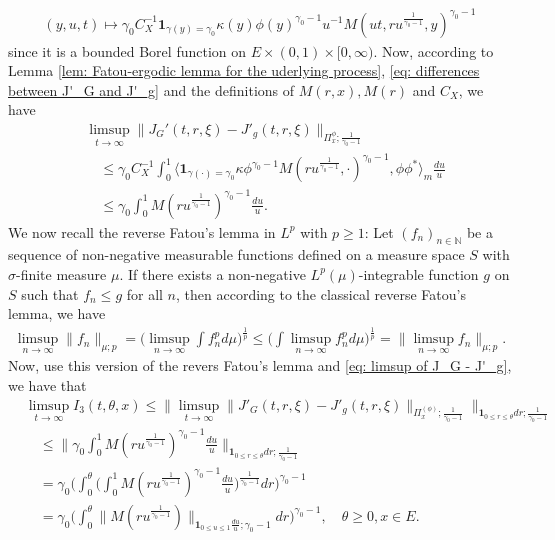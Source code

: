 \begin{align}
	(y,u,t)
	\mapsto \gamma_0 C_X^{-1}\mathbf 1_{\gamma(y) = \gamma_0} \kappa(y)  \phi(y)^{\gamma_0 - 1}  u^{-1} M(ut,ru^{\frac{1}{\gamma_0 - 1}},y)^{\gamma_0 - 1}
\end{align}
	since it is a bounded Borel function on $E\times (0,1) \times [0,\infty)$.
	Now, according to Lemma \ref{lem: Fatou-ergodic lemma for the uderlying process},  \eqref{eq: differences between J'_G and J'_g} and
    the definitions of
$M(r,x), M(r)$ and $C_X$, we have
\begin{align}\label{eq: limsup of J_G - J'_g}
	&\limsup_{t\to \infty} \| J_G'(t,r,\xi) - J'_g(t,r,\xi) \|_{\Pi_x^{\phi};\frac{1}{\gamma_0 - 1}}
	\\&\quad\leq  \gamma_0 C_X^{-1} \int_0^1 \big\langle \mathbf 1_{\gamma(\cdot) = \gamma_0} \kappa \phi^{\gamma_0 - 1} M(ru^{\frac{1}{\gamma_0 - 1}},\cdot)^{\gamma_0 - 1}, \phi\phi^* \big\rangle_m \frac{du}{u}
	\\&\quad\leq  \gamma_0  \int_0^1  M(ru^{\frac{1}{\gamma_0 - 1}})^{\gamma_0 - 1} \frac{du}{u}.
\end{align}
	We now recall the reverse Fatou's lemma in $L^p$ with $p\geq 1$: Let $(f_n)_{n\in \mathbb N}$ be a sequence of non-negative measurable functions defined on a measure space $S$ with $\sigma$-finite measure $\mu$. If there exists a non-negative $L^p(\mu)$-integrable function $g$ on $S$ such that $f_n \leq g$ for all $n$, then according to the classical reverse Fatou's lemma, we have
\begin{align}
	\limsup_{n\to \infty}\big\| f_n \big\|_{\mu;p}
	= \Big (   \limsup_{n\to \infty}  \int f^p_n d\mu        \Big)^{\frac{1}{p}}
	\leq  \Big (   \int \limsup_{n\to \infty} f^p_n d\mu        \Big)^{\frac{1}{p}}
	= \big\| \limsup_{n\to \infty} f_n \big\|_{\mu;p}.
\end{align}
	Now, use this version of the revers Fatou's lemma and \eqref{eq: limsup of J_G - J'_g}, we have that
\begin{align}
	&\limsup_{t\to \infty} I_3(t,\theta, x)
	\leq \big\| \limsup_{t\to \infty} \|    J'_G(t,r,\xi) - J'_g(t,r,\xi) \|_{\Pi_x^{(\phi)};\frac{1}{\gamma_0 - 1}} \big\|_{\mathbf 1_{0\leq r\leq \theta} dr;\frac{1}{\gamma_0 - 1}}
	\\&\quad\leq \Big\| \gamma_0  \int_0^1  M(ru^{\frac{1}{\gamma_0 - 1}})^{\gamma_0 - 1} \frac{du}{u} \Big\|_{\mathbf 1_{0\leq r\leq \theta} dr;\frac{1}{\gamma_0 - 1}}
	\\&\quad = \gamma_0 \bigg( \int_0^\theta \Big (   \int_0^1  M(ru^{\frac{1}{\gamma_0 - 1}})^{\gamma_0 - 1} \frac{du}{u}   \Big )^{\frac{1}{\gamma_0 - 1}} dr \bigg)^{\gamma_0 - 1}
	\\&\quad = \gamma_0 \Big(  \int_0^\theta  \| M(r u^{\frac{1}{\gamma_0 - 1}}) \|_{\mathbf 1_{0\leq u\leq 1}\frac{du}{u};\gamma_0 - 1}  dr\Big)^{\gamma_0 - 1},
	\quad \theta \geq 0, x\in E.
\end{align}
	
